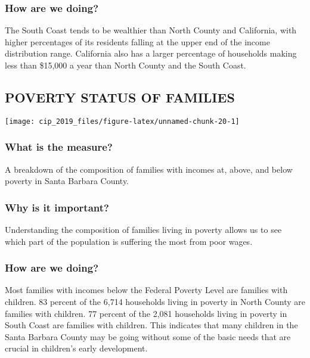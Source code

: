 \documentclass[]{book}
\theoremstyle{definition}
\theoremstyle{definition}
\theoremstyle{definition}
\theoremstyle{remark}
\begin{document}
\subsubsection*{How are we doing?}\label{how-are-we-doing-11}

The South Coast tends to be wealthier than North County and California,
with higher percentages of its residents falling at the upper end of the
income distribution range. California also has a larger percentage of
households making less than \$15,000 a year than North County and the
South Coast.

\subsection*{POVERTY STATUS OF
FAMILIES}\label{poverty-status-of-families}

\texttt{[image: cip\_2019\_files/figure-latex/unnamed-chunk-20-1]}

\subsubsection*{What is the measure?}\label{what-is-the-measure-10}

A breakdown of the composition of families with incomes at, above, and
below poverty in Santa Barbara County.

\subsubsection*{Why is it important?}\label{why-is-it-important-9}

Understanding the composition of families living in poverty allows us to
see which part of the population is suffering the most from poor wages.

\subsubsection*{How are we doing?}\label{how-are-we-doing-12}

Most families with incomes below the Federal Poverty Level are families
with children. 83 percent of the 6,714 households living in poverty in
North County are families with children. 77 percent of the 2,081
households living in poverty in South Coast are families with children.
This indicates that many children in the Santa Barbara County may be
going without some of the basic needs that are crucial in children's
early development.
\end{document}
